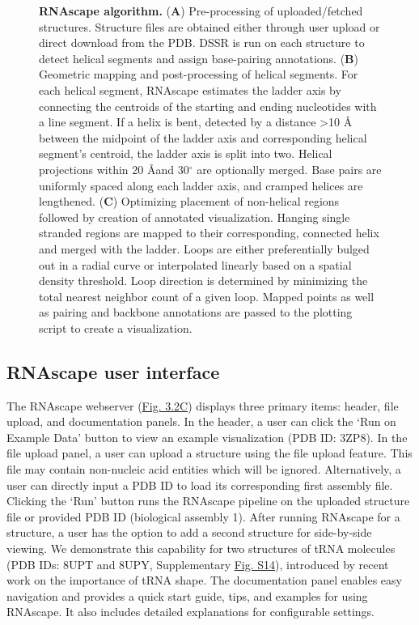 \addtocounter{figure}{-1}
\begin{center}
\begin{figure} 
  \caption[]{\textbf{RNAscape algorithm.} ({\bf A})  Pre-processing of uploaded/fetched structures. Structure files are obtained either through user upload or direct download from the PDB. DSSR is run on each structure to detect helical segments and assign base-pairing annotations. ({\bf B}) Geometric mapping and post-processing of helical segments. For each helical segment, RNAscape estimates the ladder axis by connecting the centroids of the starting and ending nucleotides with a line segment. If a helix is bent, detected by a distance >10 Å between the midpoint of the ladder axis and corresponding helical segment's centroid, the ladder axis is split into two. Helical projections within 20 \AA and 30$^{\circ}$ are optionally merged. Base pairs are uniformly spaced along each ladder axis, and cramped helices are lengthened. ({\bf C}) Optimizing placement of non-helical regions followed by creation of annotated visualization. Hanging single stranded regions are mapped to their corresponding, connected helix and merged with the ladder. Loops are either preferentially bulged out in a radial curve or interpolated linearly based on a spatial density threshold. Loop direction is determined by minimizing the total nearest neighbor count of a given loop. Mapped points as well as pairing and backbone annotations are passed to the plotting script to create a visualization.}
\end{figure}
\end{center}
\subsection{RNAscape user interface}

The RNAscape webserver (\hyperref[fig:rnascape2]{Fig. 3.2C}) displays three primary items: header, file upload, and documentation panels. In the header, a user can click the ‘Run on Example Data’ button to view an example visualization (PDB ID: 3ZP8). In the file upload panel, a user can upload a structure using the file upload feature. This file may contain non-nucleic acid entities which will be ignored. Alternatively, a user can directly input a PDB ID to load its corresponding first assembly file. Clicking the ‘Run’ button runs the RNAscape pipeline on the uploaded structure file or provided PDB ID (biological assembly 1). After running RNAscape for a structure, a user has the option to add a second structure for side-by-side viewing. We demonstrate this capability for two structures of tRNA molecules (PDB IDs: 8UPT and 8UPY, Supplementary \hyperref[fig:rnascapeS2]{Fig. S14}), introduced by recent work \citep{Krahn2024} on the importance of tRNA shape. The documentation panel enables easy navigation and provides a quick start guide, tips, and examples for using RNAscape. It also includes detailed explanations for configurable settings.

